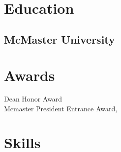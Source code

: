 \documentclass[]{farzad-resume}
\begin{document}
%
%
{\tiny }


%
%

\begin{minipage}[t]{0.30\textwidth}


\section{Education}
\subsection{McMaster University}
\sectionsep





\section{Awards}

Dean Honor Award \\
Mcmaster President Entrance Award, \\
\sectionsep


\section{Skills}

\end{minipage}
\end{document}
